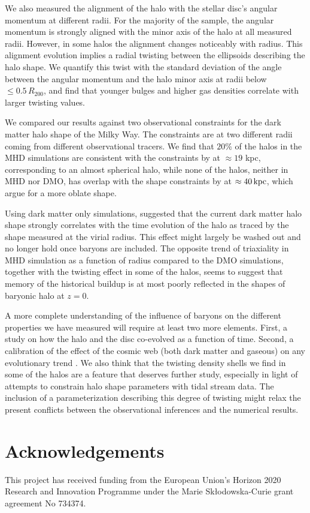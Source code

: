 \documentclass[usenatbib]{mnras}
\begin{document}
We also measured the alignment of the halo with the stellar disc's angular
momentum at different radii. For the majority of the sample, the angular momentum
is strongly aligned with the minor axis of the halo at all measured radii.
However, in some halos the alignment changes noticeably with radius. 
This alignment evolution implies a radial twisting between the ellipsoids
describing the halo shape. We quantify this twist with the standard deviation of the angle
between the angular momentum and the halo minor axis at radii below
$\leq 0.5\, R_{200}$, and find that younger bulges and higher gas
densities correlate with larger twisting values. 

We compared our results against two observational constraints for the
dark matter halo shape of the Milky Way. The constraints are at two different radii
coming from different observational tracers. 
We find that $20\%$ of the halos in the MHD simulations are consistent with
the constraints by \cite{Bovy16} at $\approx 19$ kpc,  corresponding to
an almost spherical halo, while none of the halos, neither in MHD nor
DMO, has overlap with the shape constraints by \cite{LM10} at
$\approx 40\,{\rm kpc}$, which argue for a more oblate shape.

Using dark matter only simulations, \citet{VeraCiro11} suggested that
the current dark matter halo shape strongly correlates with the time
evolution of the halo as traced by the shape measured at the virial radius. 
This effect might largely be washed out and no longer hold once baryons are included. 
The opposite trend of triaxiality in MHD simulation as a function of
radius compared to the DMO simulations, together with the twisting effect in some of 
the halos, seems to suggest that memory of the historical buildup is at most poorly 
reflected in the shapes of baryonic halo at $z=0$.


A more complete understanding of the influence of baryons on the
different properties we have measured will require at least two more elements.
First, a study on how the halo and the disc co-evolved as a
function of time. Second, a calibration of the effect of the cosmic web
(both dark matter and gaseous) on any evolutionary trend
\citep{2014MNRAS.443.1090F, 2017MNRAS.469..594B, 2019MNRAS.487.1607G}.
We also think  that the twisting density shells we find in
some of the halos are a feature that deserves further study, especially
in light of attempts to  constrain halo shape parameters with tidal stream data.  The
inclusion of a parameterization describing this degree of twisting
might relax the present conflicts between the observational inferences and the
numerical results.  


\section*{Acknowledgements}
This project has received funding from the European Union's Horizon
2020 Research and Innovation Programme under the Marie
Sk\l{}odowska-Curie grant agreement No 734374. 



\end{document}
